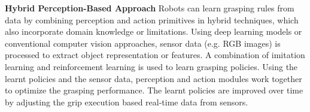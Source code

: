 \vspace{5mm}

\textbf{Hybrid Perception-Based Approach} Robots can learn grasping rules from data by combining perception and action primitives in hybrid techniques, which also incorporate domain knowledge or limitations. Using deep learning models or conventional computer vision approaches, sensor data (e.g. \ac{RGB} images) is processed to extract object representation or features. A combination of  imitation learning and reinforcement learning is used to learn grasping policies. Using the learnt policies and the sensor data, perception and action modules work together to optimize the grasping performance. The learnt policies are improved over time by adjusting the grip execution based real-time data from sensors.\cite{jang2018grasp2vec} 

